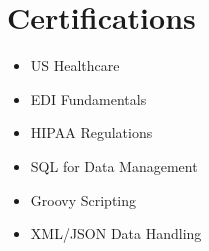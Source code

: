 \documentclass[a4paper,12pt]{article}
\begin{document}
\section{Certifications}
\begin{multicols}{2}
\begin{itemize}[leftmargin=1em]
    \item US Healthcare
    \item EDI Fundamentals
    \item HIPAA Regulations
    \item SQL for Data Management
    \item Groovy Scripting
    \item XML/JSON Data Handling
\end{itemize}
\end{multicols}
\end{document}
